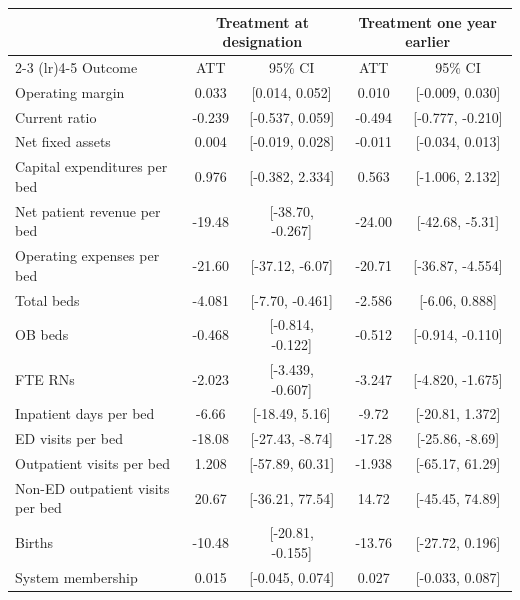 \begin{tabular}{lcccc}
\toprule
 & \multicolumn{2}{c}{Treatment at designation} & \multicolumn{2}{c}{Treatment one year earlier} \\
\cmidrule(lr){2-3} \cmidrule(lr){4-5}
Outcome & ATT & 95\% CI & ATT & 95\% CI \\
\midrule
Operating margin & 0.033 & [0.014, 0.052] & 0.010 & [-0.009, 0.030] \\
Current ratio & -0.239 & [-0.537, 0.059] & -0.494 & [-0.777, -0.210] \\
Net fixed assets & 0.004 & [-0.019, 0.028] & -0.011 & [-0.034, 0.013] \\
Capital expenditures per bed & 0.976 & [-0.382, 2.334] & 0.563 & [-1.006, 2.132] \\
Net patient revenue per bed & -19.48 & [-38.70, -0.267] & -24.00 & [-42.68, -5.31] \\
Operating expenses per bed & -21.60 & [-37.12, -6.07] & -20.71 & [-36.87, -4.554] \\
\addlinespace
Total beds & -4.081 & [-7.70, -0.461] & -2.586 & [-6.06, 0.888] \\
OB beds & -0.468 & [-0.814, -0.122] & -0.512 & [-0.914, -0.110] \\
FTE RNs & -2.023 & [-3.439, -0.607] & -3.247 & [-4.820, -1.675] \\
Inpatient days per bed & -6.66 & [-18.49, 5.16] & -9.72 & [-20.81, 1.372] \\
\addlinespace
ED visits per bed & -18.08 & [-27.43, -8.74] & -17.28 & [-25.86, -8.69] \\
Outpatient visits per bed & 1.208 & [-57.89, 60.31] & -1.938 & [-65.17, 61.29] \\
Non-ED outpatient visits per bed & 20.67 & [-36.21, 77.54] & 14.72 & [-45.45, 74.89] \\
Births & -10.48 & [-20.81, -0.155] & -13.76 & [-27.72, 0.196] \\
\addlinespace
System membership & 0.015 & [-0.045, 0.074] & 0.027 & [-0.033, 0.087] \\
\bottomrule
\end{tabular}
